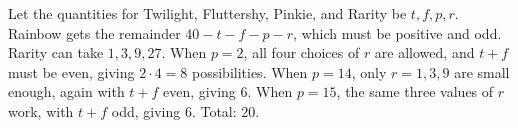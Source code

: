Let the quantities for Twilight, Fluttershy, Pinkie, and Rarity be $t,f,p,r$. Rainbow gets the remainder $40-t-f-p-r$, which must be positive and odd. Rarity can take $1,3,9,27$. When $p=2$, all four choices of $r$ are allowed, and $t+f$ must be even, giving $2\cdot4=8$ possibilities. When $p=14$, only $r=1,3,9$ are small enough, again with $t+f$ even, giving $6$. When $p=15$, the same three values of $r$ work, with $t+f$ odd, giving $6$. Total: $\boxed{20}$.

